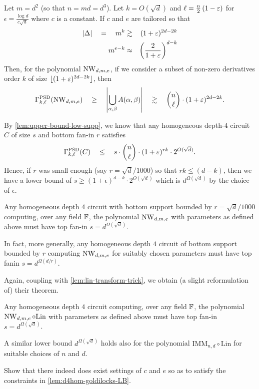 \begin{lemma}\label{lem:d4hom-goldilocks-LB}
Let $m = d^2$ (so that $n = md = d^3$). 
Let $k = O(\sqrt{d})$ and  $\ell  = \frac{n}{2}\left(1 - \varepsilon\right)$ for $\epsilon = \frac{\log d}{c \sqrt{d}}$ where $c$ is a constant. 
If $c$ and $e$ are tailored so that 
\begin{eqnarray*}
 \left|\Delta\right| \quad = \quad m^k & \gtrsim &  (1+\varepsilon)^{2d - 2k}\\
 m^{e-k} & \approx & \left(\frac{2}{1+\varepsilon}\right)^{d-k}
\end{eqnarray*}
Then, for the polynomial $\operatorname{\mathrm{NW}}_{d,m,e}$, if we consider a subset of non-zero derivatives order $k$ of size $\lfloor (1+\varepsilon)^{2d - 2k} \rfloor$, then
\[
\Gamma^{\mathrm{PSD}}_{k,\ell}(\operatorname{\mathrm{NW}}_{d,m,e})\quad \geq \quad\left|\bigcup_{\alpha, \beta} A(\alpha, \beta)\right| \quad \gtrsim \quad \binom{n}{\ell} \cdot (1+\varepsilon)^{2d-2k}.
\] 
\end{lemma}

By \autoref{lem:upper-bound-low-supp}, we know that any homogeneous depth-$4$ circuit $C$ of size $s$ and bottom fan-in $r$ satisfies
\[
\Gamma^{\mathrm{PSD}}_{k,\ell}(C)\quad \leq \quad s \cdot \binom{n}{\ell} \cdot (1+\varepsilon)^{rk} \cdot 2^{O(\sqrt{d})}.
\]
Hence, if $r$ was small enough (say $r = \sqrt{d}/1000$) so that $rk \leq (d-k)$, then we have a lower bound of $s \geq (1+\epsilon)^{d-k} \cdot 2^{O(\sqrt{d})}$ which is $d^{\Omega(\sqrt{d})}$ by the choice of $\epsilon$. 
\begin{theorem}[\cite{KS14}]\label{thm:IMM-lowsup-lb}
Any homogeneous depth $4$ circuit with bottom support bounded by $r = \sqrt{d}/1000$ computing, over any field $\mathbb{F}$, the polynomial $\operatorname{\mathrm{NW}}_{d,m,e}$ with parameters as defined above must have top fan-in $s = d^{\Omega(\sqrt{d})}$. 

In fact, more generally, any homogeneous depth $4$ circuit of bottom support bounded by $r$ computing $\operatorname{\mathrm{NW}}_{d,m,e}$ for suitably chosen parameters must have top fanin $s = d^{\Omega(d/r)}$. 
\end{theorem}

Again, coupling with \autoref{lem:lin-transform-trick}, we obtain (a slight reformulation of) their theorem. 

\begin{theorem}\label{thm:IMM-lb}
Any homogeneous depth $4$ circuit computing, over any field $\mathbb{F}$,  the polynomial $\operatorname{\mathrm{NW}}_{d,m,e}\circ \mathrm{Lin}$ with parameters as defined above must have top fan-in $s = d^{\Omega(\sqrt{d})}$. 

A similar lower bound $d^{\Omega(\sqrt{d})}$ holds also for the polynomial $\mathrm{IMM}_{n,d} \circ \mathrm{Lin}$ for suitable choices of $n$ and $d$. 
\end{theorem}

\begin{exercise} Show that there indeed does exist settings of $c$ and $e$ so as to satisfy the constraints in \autoref{lem:d4hom-goldilocks-LB}.
\end{exercise}
